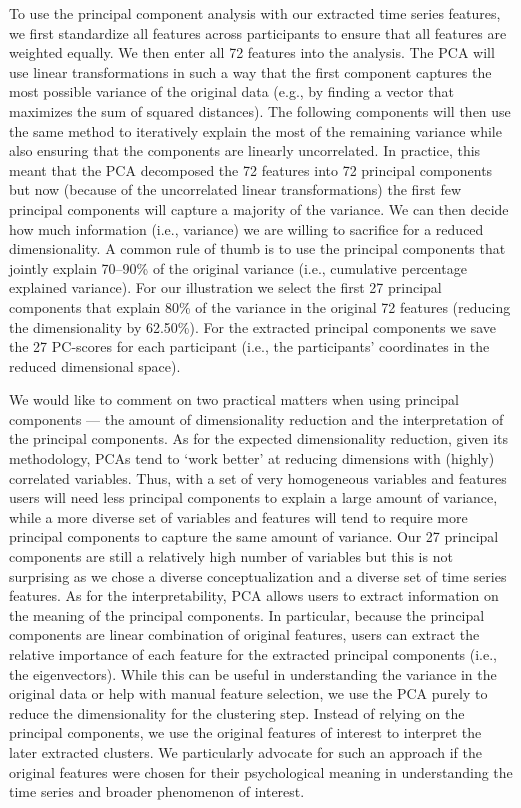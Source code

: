 To use the principal component analysis with our extracted time series
features, we first standardize all features across participants to
ensure that all features are weighted equally. We then enter all 72
features into the analysis. The PCA will use linear transformations in
such a way that the first component captures the most possible variance
of the original data (e.g., by finding a vector that maximizes the sum
of squared distances). The following components will then use the same
method to iteratively explain the most of the remaining variance while
also ensuring that the components are linearly uncorrelated. In
practice, this meant that the PCA decomposed the 72 features into 72
principal components but now (because of the uncorrelated linear
transformations) the first few principal components will capture a
majority of the variance. We can then decide how much information (i.e.,
variance) we are willing to sacrifice for a reduced dimensionality. A
common rule of thumb is to use the principal components that jointly
explain 70--90\% of the original variance (i.e., cumulative percentage
explained variance). For our illustration we select the first 27
principal components that explain 80\% of the variance in the original
72 features (reducing the dimensionality by 62.50\%). For the extracted
principal components we save the 27 PC-scores for each participant
(i.e., the participants' coordinates in the reduced dimensional space).

We would like to comment on two practical matters when using principal
components --- the amount of dimensionality reduction and the
interpretation of the principal components. As for the expected
dimensionality reduction, given its methodology, PCAs tend to `work
better' at reducing dimensions with (highly) correlated variables. Thus,
with a set of very homogeneous variables and features users will need
less principal components to explain a large amount of variance, while a
more diverse set of variables and features will tend to require more
principal components to capture the same amount of variance. Our 27
principal components are still a relatively high number of variables but
this is not surprising as we chose a diverse conceptualization and a
diverse set of time series features. As for the interpretability, PCA
allows users to extract information on the meaning of the principal
components. In particular, because the principal components are linear
combination of original features, users can extract the relative
importance of each feature for the extracted principal components (i.e.,
the eigenvectors). While this can be useful in understanding the
variance in the original data or help with manual feature selection, we
use the PCA purely to reduce the dimensionality for the clustering step.
Instead of relying on the principal components, we use the original
features of interest to interpret the later extracted clusters. We
particularly advocate for such an approach if the original features were
chosen for their psychological meaning in understanding the time series
and broader phenomenon of interest.

